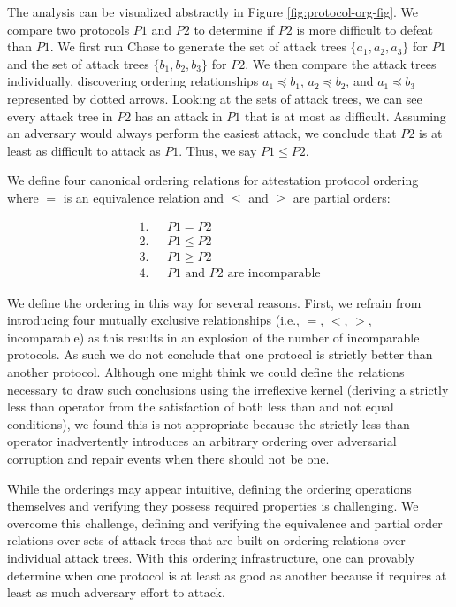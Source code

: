 \documentclass[runningheads]{llncs}
\theoremstyle{definition}
\begin{document}
The analysis can be visualized abstractly in Figure
\ref{fig:protocol-org-fig}.  We compare two protocols $P1$ and $P2$ to
determine if $P2$ is more difficult to defeat than $P1$. We first run
Chase to generate the set of attack trees $\{ a_1, a_2, a_3\}$ for
$P1$ and the set of attack trees $\{b_1, b_2, b_3\}$ for $P2$. We then
compare the attack trees individually, discovering ordering
relationships $a_1 \preceq b_1$, $a_2 \preceq b_2$, and
$a_1 \preceq b_3$ represented by dotted arrows. Looking at the sets of
attack trees, we can see every attack tree in $P2$ has an attack in
$P1$ that is at most as difficult. Assuming an adversary would always
perform the easiest attack, we conclude that $P2$ is at least as
difficult to attack as $P1$. Thus, we say $P1 \leq P2$.

We define four canonical ordering relations for attestation
protocol ordering where $=$ is an equivalence relation and $\le$ and
$\ge$ are partial orders:

\vspace*{-5mm}

\begin{align*}
1. & \text{ } P1 = P2 \\
2. & \text{ } P1 \le P2 \\
3. & \text{ } P1 \ge P2 \\
4. & \text{ } P1 \text{ and } P2 \text{ are incomparable}
\end{align*}

\noindent We define the ordering in this way for several
reasons. First, we refrain from introducing four mutually exclusive
relationships (i.e., $=$, $<$, $>$, incomparable) as this results in
an explosion of the number of incomparable protocols. As such we do
not conclude that one protocol is strictly better than another
protocol. Although one might think we could define the relations
necessary to draw such conclusions using the irreflexive kernel
(deriving a strictly less than operator from the satisfaction of both
less than and not equal conditions), we found this is not appropriate
because the strictly less than operator inadvertently introduces
an arbitrary ordering over adversarial corruption and repair events
when there should not be one.

While the orderings may appear intuitive, defining the ordering
operations themselves and verifying they possess required properties is
challenging. We overcome this challenge, defining and
verifying the equivalence and partial order relations over sets of
attack trees that are built on ordering relations over individual
attack trees. With this ordering infrastructure, one can provably
determine when one protocol is at least as good as another because it
requires at least as much adversary effort to attack.
\end{document}
